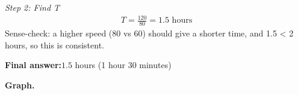 \documentclass[11pt]{article}
\begin{document}
\textit{Step 2: Find T}
\[\begin{gathered}
T = \frac{120}{80} = 1.5 \text{ hours}
\end{gathered}\]
Sense-check: a higher speed (80 vs 60) should give a shorter time, and 1.5 < 2 hours, so this is consistent.

\begin{answerbox}
\textbf{Final answer:}\quad \(\displaystyle 1.5\) hours (1 hour 30 minutes)
\end{answerbox}
\textbf{Graph.}

\begin{center}
\end{center}
\end{document}
